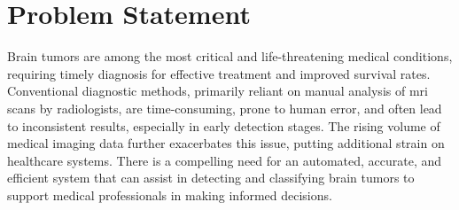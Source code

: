 \newpage
\section{Problem Statement}
Brain tumors are among the most critical and life-threatening medical conditions, requiring timely diagnosis for effective treatment and improved survival rates. Conventional diagnostic methods, primarily reliant on manual analysis of \gls{mri} scans by radiologists, are time-consuming, prone to human error, and often lead to inconsistent results, especially in early detection stages. The rising volume of medical imaging data further exacerbates this issue, putting additional strain on healthcare systems. There is a compelling need for an automated, accurate, and efficient system that can assist in detecting and classifying brain tumors to support medical professionals in making informed decisions.

